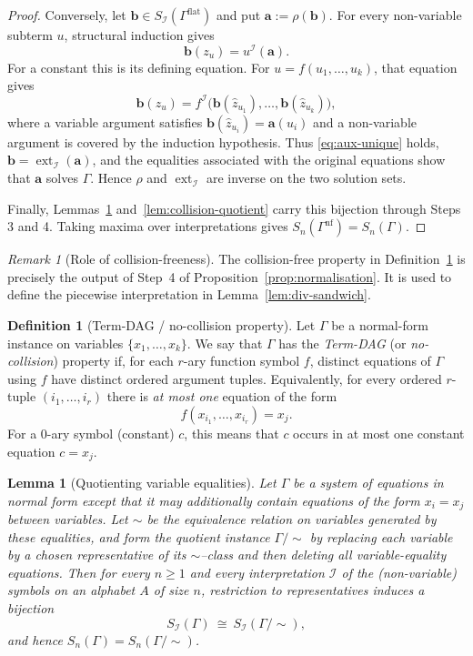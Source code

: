 \documentclass[11pt]{article}
\theoremstyle{plain}
\newtheorem{lemma}[theorem]{Lemma}
\theoremstyle{definition}
\theoremstyle{definition}
\newtheorem{definition}[theorem]{Definition}
\theoremstyle{remark}
\newtheorem{remark}[theorem]{Remark}
\newcommand{\A}{A}
\newcommand{\Sn}{S_n}
\begin{document}
\begin{proof}
Conversely, let $\mathbf b\in S_{\mathcal I}(\Gamma^{\mathrm{flat}})$ and put $\mathbf a:=\rho(\mathbf b)$.
For every non-variable subterm $u$, structural induction gives
\begin{equation}\label{eq:aux-unique}
  \mathbf b(z_u)=u^{\mathcal I}(\mathbf a).
\end{equation}
For a constant this is its defining equation. For $u=f(u_1,\dots,u_k)$, that equation gives
\[
  \mathbf b(z_u)=f^{\mathcal I}\bigl(\mathbf b(\widehat z_{u_1}),\dots,\mathbf b(\widehat z_{u_k})\bigr),
\]
where a variable argument satisfies
$\mathbf b(\widehat z_{u_i})=\mathbf a(u_i)$ and a non-variable argument is covered by the induction hypothesis.
Thus \eqref{eq:aux-unique} holds, $\mathbf b=\operatorname{ext}_{\mathcal I}(\mathbf a)$, and the equalities associated
with the original equations show that $\mathbf a$ solves $\Gamma$. Hence $\rho$ and
$\operatorname{ext}_{\mathcal I}$ are inverse on the two solution sets.

Finally, Lemmas~\ref{lem:quotient} and~\ref{lem:collision-quotient} carry this bijection through Steps 3 and 4.
Taking maxima over interpretations gives $\Sn(\Gamma^{\mathrm{nf}})=\Sn(\Gamma)$.
\end{proof}

\begin{remark}[Role of collision-freeness]
\label{rem:term-dag}
The collision-free property in Definition~\ref{def:term-dag} is precisely the output of
Step~4 of Proposition~\ref{prop:normalisation}. It is used to define the piecewise
interpretation in Lemma~\ref{lem:div-sandwich}.
\end{remark}

\begin{definition}[Term-DAG / no-collision property]
\label{def:term-dag}
Let $\Gamma$ be a normal-form instance on variables $\{x_1,\dots,x_k\}$.
We say that $\Gamma$ has the \emph{Term-DAG} (or \emph{no-collision}) property if, for each $r$-ary function symbol $f$,
distinct equations of $\Gamma$ using $f$ have distinct ordered argument tuples.
Equivalently, for every ordered $r$-tuple $(i_1,\dots,i_r)$ there is \emph{at most one} equation of the form
\[ f(x_{i_1},\dots,x_{i_r})=x_j. \]
For a $0$-ary symbol (constant) $c$, this means that $c$ occurs in at most one constant equation $c=x_j$.
\end{definition}

\begin{lemma}[Quotienting variable equalities]
\label{lem:quotient}
Let $\Gamma$ be a system of equations in normal form \emph{except} that it may additionally contain
equations of the form $x_i=x_j$ between variables.
Let $\sim$ be the equivalence relation on variables generated by these equalities, and form the quotient
instance $\Gamma/\!\sim$ by replacing each variable by a chosen representative of its $\sim$--class and then
deleting all variable-equality equations.
Then for every $n\ge 1$ and every interpretation $\mathcal I$ of the (non-variable) symbols on an alphabet
$\A$ of size $n$, restriction to representatives induces a bijection
\[
S_{\mathcal I}(\Gamma)\ \cong\ S_{\mathcal I}(\Gamma/\!\sim),
\]
and hence $\Sn(\Gamma)=\Sn(\Gamma/\!\sim)$.
\end{lemma}
\end{document}

